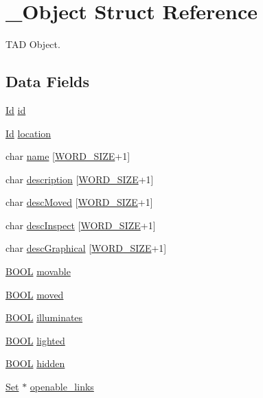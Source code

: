 \hypertarget{struct___object}{\section{\+\_\+\+Object Struct Reference}
\label{struct___object}
}


T\+A\+D Object.  


\subsection*{Data Fields}
\begin{DoxyCompactItemize}
\item 
\hyperlink{_types_8h_a845e604fb28f7e3d97549da3448149d3}{Id} \hyperlink{struct___object_a150a709e86e7134d17cd063de6810b6c}{id}
\item 
\hyperlink{_types_8h_a845e604fb28f7e3d97549da3448149d3}{Id} \hyperlink{struct___object_a5ef730c626751b65a24f4666d2c70a91}{location}
\item 
char \hyperlink{struct___object_a2b7341aac5f9360a8e88ae1061f497d2}{name} \mbox{[}\hyperlink{_types_8h_a92ed8507d1cd2331ad09275c5c4c1c89}{W\+O\+R\+D\+\_\+\+S\+I\+Z\+E}+1\mbox{]}
\item 
char \hyperlink{struct___object_a986940b5717dab72fc54860fd6e0d5fd}{description} \mbox{[}\hyperlink{_types_8h_a92ed8507d1cd2331ad09275c5c4c1c89}{W\+O\+R\+D\+\_\+\+S\+I\+Z\+E}+1\mbox{]}
\item 
char \hyperlink{struct___object_adf95ff7415d63695d1ff70ae6043747d}{desc\+Moved} \mbox{[}\hyperlink{_types_8h_a92ed8507d1cd2331ad09275c5c4c1c89}{W\+O\+R\+D\+\_\+\+S\+I\+Z\+E}+1\mbox{]}
\item 
char \hyperlink{struct___object_a03234f00395c777593ac3f5b591b51ab}{desc\+Inspect} \mbox{[}\hyperlink{_types_8h_a92ed8507d1cd2331ad09275c5c4c1c89}{W\+O\+R\+D\+\_\+\+S\+I\+Z\+E}+1\mbox{]}
\item 
char \hyperlink{struct___object_aeeb1a7cbcd065a4b3dd012ab2328718a}{desc\+Graphical} \mbox{[}\hyperlink{_types_8h_a92ed8507d1cd2331ad09275c5c4c1c89}{W\+O\+R\+D\+\_\+\+S\+I\+Z\+E}+1\mbox{]}
\item 
\hyperlink{_types_8h_a3e5b8192e7d9ffaf3542f1210aec18dd}{B\+O\+O\+L} \hyperlink{struct___object_a95316b8952c59a32e9a9301280ce0fdc}{movable}
\item 
\hyperlink{_types_8h_a3e5b8192e7d9ffaf3542f1210aec18dd}{B\+O\+O\+L} \hyperlink{struct___object_a72d230d97bc8e2725c8c8c2a52cd47b7}{moved}
\item 
\hyperlink{_types_8h_a3e5b8192e7d9ffaf3542f1210aec18dd}{B\+O\+O\+L} \hyperlink{struct___object_adee3e2949a9ff2ac1f966508b19e6e6b}{illuminates}
\item 
\hyperlink{_types_8h_a3e5b8192e7d9ffaf3542f1210aec18dd}{B\+O\+O\+L} \hyperlink{struct___object_a963d51c17921e9f9ee0f4008734d34ae}{lighted}
\item 
\hyperlink{_types_8h_a3e5b8192e7d9ffaf3542f1210aec18dd}{B\+O\+O\+L} \hyperlink{struct___object_a5192c09c47c3dc2f8088ac85242edbff}{hidden}
\item 
\hyperlink{_set_8h_a6d3b7f7c92cbb4577ef3ef7ddbf93161}{Set} $\ast$ \hyperlink{struct___object_af2a87b4aa7c9b00685229df2324c262d}{openable\+\_\+links}
\end{DoxyCompactItemize}


